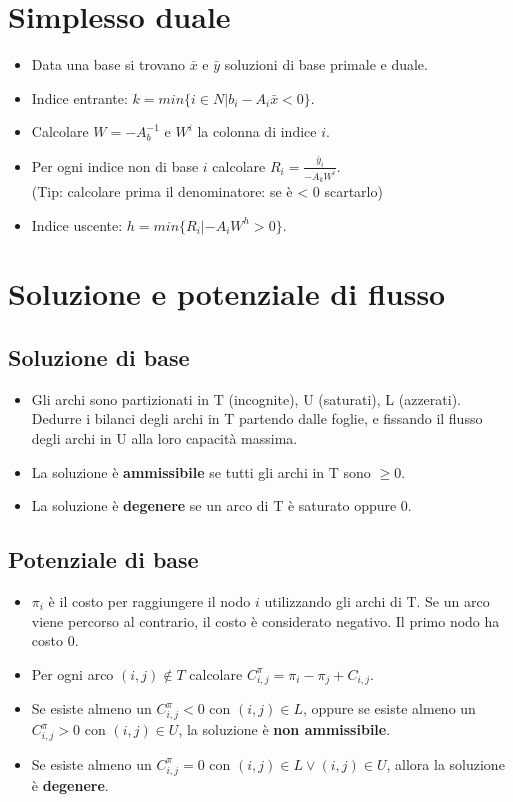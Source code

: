 \documentclass[9pt]{extarticle}
\begin{document}
\begin{multicols}{2}
\section{Simplesso duale}
\begin{itemize}
    \setlength{\itemsep}{-3pt}
    \item Data una base si trovano $\bar{x}$ e $\bar{y}$ soluzioni di base
        primale e duale.
    \item Indice entrante: $k = min\{i \in N | b_i - A_i \bar{x} < 0 \}$.
    \item Calcolare $W = -A_b^{-1}$ e $W^i$ la colonna di indice $i$.
    \item Per ogni indice non di base $i$ calcolare
        $R_i = \frac{\bar{y}_i}{-A_kW^i}$.\\
        (Tip: calcolare prima il denominatore: se è < 0 scartarlo)
    \item Indice uscente: $h = min\{R_i | -A_iW^h > 0\}$.
\end{itemize}

\section{Soluzione e potenziale di flusso}
\subsection{Soluzione di base}
\begin{itemize}
    \setlength{\itemsep}{-3pt}
    \item Gli archi sono partizionati in T (incognite), U (saturati), L
        (azzerati). \\
        Dedurre i bilanci degli archi in T partendo dalle foglie, e fissando il
        flusso degli archi in U alla loro capacità massima.
    \item La soluzione è \textbf{ammissibile} se tutti gli archi in T sono
        $\ge 0$.
    \item La soluzione è \textbf{degenere} se un arco di T è saturato oppure 0.
\end{itemize}
\subsection{Potenziale di base}
\begin{itemize}
    \setlength{\itemsep}{-3pt}
    \item $\pi_i$ è il costo per raggiungere il nodo $i$ utilizzando gli archi
        di T. Se un arco viene percorso al contrario, il costo è considerato
        negativo. Il primo nodo ha costo 0.
    \item Per ogni arco $(i,j) \notin T$ calcolare $C_{i,j}^\pi = \pi_i - \pi_j
        + C_{i,j}$.
    \item Se esiste almeno un $C_{i,j}^\pi < 0$ con $(i,j) \in L$, oppure se
        esiste almeno un $C_{i,j}^\pi > 0$ con $(i,j) \in U$, la soluzione è
        \textbf{non ammissibile}.
    \item Se esiste almeno un $C_{i,j}^\pi = 0$ con $(i,j) \in L \lor (i,j)\in
        U$, allora la soluzione è \textbf{degenere}.
\end{itemize}


\end{multicols}
\end{document}
